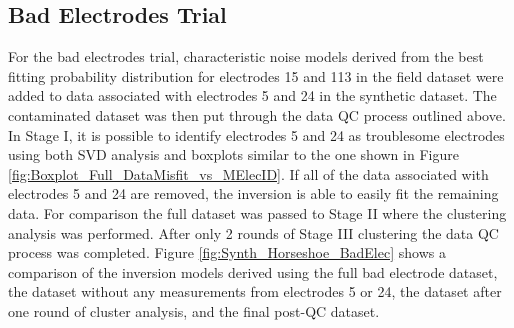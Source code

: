 \documentclass[final,authoryear,5p,times,twocolumn]{elsarticle}
\begin{document}
\subsection{Bad Electrodes Trial}

For the bad electrodes trial, characteristic noise models derived from the best fitting probability distribution for electrodes 15 and 113 in the field dataset were added to data associated with electrodes 5 and 24 in the synthetic dataset. The contaminated dataset was then put through the data QC process outlined above. In Stage I, it is possible to identify electrodes 5 and 24 as troublesome electrodes using both SVD analysis and boxplots similar to the one shown in Figure \ref{fig:Boxplot_Full_DataMisfit_vs_MElecID}. If all of the data associated with electrodes 5 and 24 are removed, the inversion is able to easily fit the remaining data. For comparison the full dataset was passed to Stage II where the clustering analysis was performed. After only 2 rounds of Stage III clustering the data QC process was completed. Figure \ref{fig:Synth_Horseshoe_BadElec} shows a comparison of the inversion models derived using the full bad electrode dataset, the dataset without any measurements from electrodes 5 or 24, the dataset after one round of cluster analysis, and the final post-QC dataset. 
\end{document}
